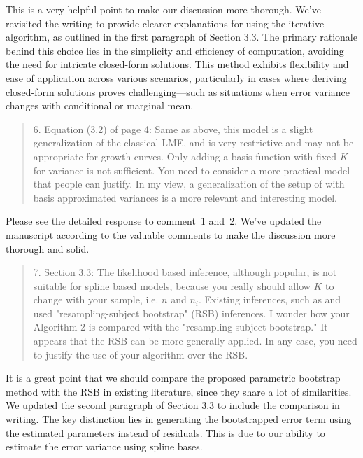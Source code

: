 \documentclass[12pt]{article}
\newenvironment{comment}%
{\begin{quotation}\noindent\small\it\ignorespaces%
  }{\end{quotation}}
\begin{document}
This is a very helpful point to make our discussion more
thorough. We've revisited the writing to provide clearer explanations for using
the iterative algorithm, as outlined in the first paragraph of
Section 3.3. The primary rationale behind this choice lies in the
simplicity and efficiency of computation, avoiding the need for
intricate closed-form solutions. This method exhibits flexibility and
ease of application across various scenarios, particularly in cases
where deriving closed-form solutions proves challenging—such as
situations when error variance changes with conditional or
marginal mean.


\begin{comment}
  6. Equation (3.2) of page 4: Same as above, this model is a slight
  generalization of the classical LME, and is very restrictive and may
  not be appropriate for growth curves. Only adding a basis function
  with fixed $K$ for variance is not sufficient. You need to consider
  a more practical model that people can justify. In my view, a
  generalization of the setup of \cite{huang2002varying} with basis
  approximated variances is a more relevant and interesting model.
\end{comment}

Please see the detailed response to comment~1 and~2. We've updated the
manuscript according to the valuable comments to make the discussion
more thorough and solid.


\begin{comment}
7. Section 3.3: The likelihood based inference, although popular, is
not suitable for spline based models, because you really should allow
$K$ to change with your sample, i.e. $n$ and $n_i$. Existing
inferences, such as \cite{huang2002varying} and \cite{wu2018nonparametric}
used "resampling-subject bootstrap" (RSB) inferences. I wonder how
your Algorithm 2 is compared with the "resampling-subject bootstrap."
It appears that the RSB can be more generally applied. In any case,
you need to justify the use of your algorithm over the RSB.
\end{comment}


It is a great point that we should compare the proposed parametric
bootstrap method with the RSB in existing literature, since they share
a lot of similarities. We updated the second paragraph of Section 3.3
to include the comparison in writing. The key distinction lies in
generating the bootstrapped error term using the estimated parameters
instead of residuals. This is due to our ability
to estimate the error variance using spline bases.
\end{document}
